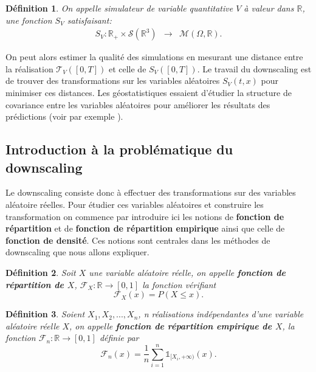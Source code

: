 \documentclass[a4paper,10pt]{article}
\newtheorem{definition}{Définition}
\begin{document}
\begin{definition}
	\label{simu_terre}
	On appelle simulateur de variable quantitative $V$ à valeur dans $\mathbb{R}$, une fonction $S_V$ satisfaisant:
	\begin{equation}
		\begin{array}{ccc}
			S_V: \mathbb{R}_{+}\times\mathcal{S}(\mathbb{R}^{3}) & \to & \mathcal{M}(\Omega,\mathbb{R}).
		\end{array}
	\end{equation}
\end{definition}

On peut alors estimer la qualité des simulations en mesurant une distance entre la réalisation $\mathcal{T}_V([0,T])$ et celle de $S_V([0,T])$. Le travail du downscaling est de trouver des transformations sur les variables aléatoires $S_V(t,x)$ pour minimiser ces distances. Les géostatistiques essaient d'étudier la structure de covariance entre les variables aléatoires pour améliorer les résultats des prédictions (voir par exemple \cite{lindgren2011explicit}).  

\subsection{Introduction à la problématique du downscaling}
\label{intro-dwnsc}
Le downscaling consiste donc à effectuer des transformations sur des variables aléatoire réelles. Pour étudier ces variables aléatoires et construire les transformation on commence par introduire ici les notions de \textbf{fonction de répartition} et de \textbf{fonction de répartition empirique} ainsi que celle de \textbf{fonction de densité}. Ces notions sont centrales dans les méthodes de downscaling que nous allons expliquer.

\begin{definition}
	Soit $X$ une variable aléatoire réelle, on appelle \textbf{fonction de répartition de $X$}, $\mathcal{F}_{X}: \mathbb{R}\to [0,1]$ la fonction vérifiant
	\begin{equation}
		\mathcal{F}_{X}(x)=P(X\leq x).
	\end{equation}
\end{definition}

\begin{definition}
	Soient $X_1,X_2,...,X_n$, n réalisations indépendantes d'une variable aléatoire réelle $X$, on appelle \textbf{fonction de répartition empirique de $X$}, la fonction $\mathcal{F}_{n}:\mathbb{R}\to [0,1]$ définie par
	\begin{equation}
		\mathcal{F}_{n}(x)= \frac{1}{n}\sum_{i=1}^{n}\mathds{1}_{[X_i, +\infty )}(x).
	\end{equation}
\end{definition}
\end{document}
